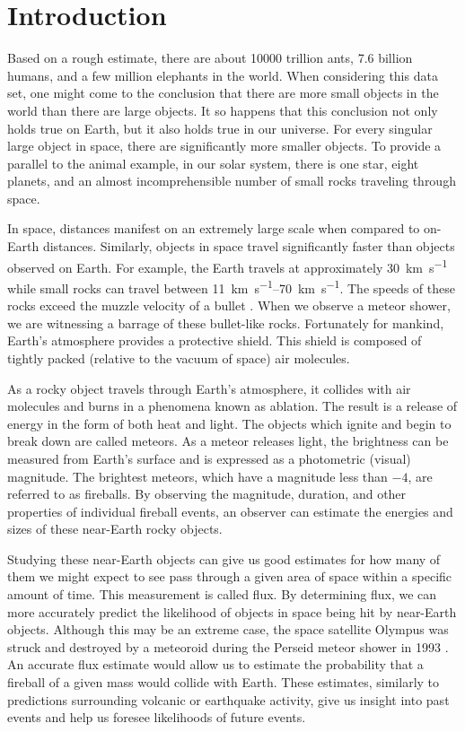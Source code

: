 \chapter{Introduction}

Based on a rough estimate, there are about \num{10000} trillion ants, \num{7.6} billion humans, and a few million elephants in the world.
When considering this data set, one might come to the conclusion that there are more small objects in the world than there are large objects.
It so happens that this conclusion not only holds true on Earth, but it also holds true in our universe.
For every singular large object in space, there are significantly more smaller objects.
To provide a parallel to the animal example, in our solar system, there is one star, eight planets, and an almost incomprehensible number of small rocks traveling through space. 

In space, distances manifest on an extremely large scale when compared to on-Earth distances.  
Similarly, objects in space travel significantly faster than objects observed on Earth.
For example, the Earth travels at approximately \SI{30}{\kilo\meter\per\second} while small rocks can travel between \SIrange{11}{70}{\kilo\meter\per\second}.  
The speeds of these rocks exceed the muzzle velocity of a bullet \cite{russell_photometry_2018}.
When we observe a meteor shower, we are witnessing a barrage of these bullet-like rocks.  
Fortunately for mankind, Earth’s atmosphere provides a protective shield.
This shield is composed of tightly packed (relative to the vacuum of space) air molecules.

As a rocky object travels through Earth’s atmosphere, it collides with air molecules and burns in a phenomena known as ablation.  
The result is a release of energy in the form of both heat and light.  
The objects which ignite and begin to break down are called meteors.
As a meteor releases light, the brightness can be measured from Earth's surface and is expressed as a photometric (visual) magnitude. 
The brightest meteors, which have a magnitude less than $-4$, are referred to as fireballs.
By observing the magnitude, duration, and other properties of individual fireball events, an observer can estimate the energies and sizes of these near-Earth rocky objects.


Studying these near-Earth objects can give us good estimates for how many of them we might expect to see pass through a given area of space within a specific amount of time.
This measurement is called flux.
By determining flux, we can more accurately predict the likelihood of objects in space being hit by near-Earth objects. 
Although this may be an extreme case, the space satellite Olympus was struck and destroyed by a meteoroid during the Perseid meteor shower in 1993 \cite{bobrowsky_comet/asteroid_nodate}.
An accurate flux estimate would allow us to estimate the probability that a fireball of a given mass would collide with Earth.
These estimates, similarly to predictions surrounding volcanic or earthquake activity, give us insight into past events and help us foresee likelihoods of future events.

